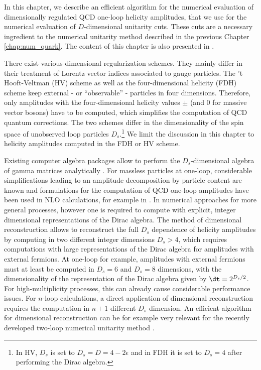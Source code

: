 In this chapter, we describe an efficient algorithm for the numerical
evaluation of dimensionally regulated
QCD one-loop helicity amplitudes, that we use for the numerical
evaluation of $D$-dimensional unitarity cuts. These cuts are a
necessary ingredient to the numerical
  unitarity method described in the previous Chapter
\ref{chap:num_quark}. The content of this chapter is also presented in \cite{angerds}.

There exist various dimensional
regularization schemes. They mainly differ in their
treatment of Lorentz vector indices associated to gauge particles. The
't Hooft-Veltman (HV) scheme \cite{tHooft:1972tcz} as well as the
four-dimensional helicity (FDH) scheme \cite{Bern:1991aq,Bern:2002zk}
keep external - or ``observable'' - particles in four
dimensions. Therefore, only amplitudes with the four-dimensional helicity values $\pm$ (and
$0$ for massive vector bosons) have
to be computed, which simplifies the computation of QCD quantum
corrections. The two schemes differ in the dimensionality
of the spin space of unobserved loop particles $D_s$.\footnote{In HV,
  $D_s$ is set to $D_s=D=4-2\epsilon$ and in FDH it is set to $D_s=4$ after
performing the Dirac algebra.} We limit the discussion in this chapter to
helicity amplitudes computed in the FDH or HV scheme.

Existing computer algebra packages allow to perform the $D_s$-dimensional algebra
of gamma matrices analytically \cite{Hahn:1998yk,Cullen2010}. For
massless particles at one-loop, considerable simplifications leading to an
amplitude decomposition by particle content are known
\cite{Bern:1994cg,Bern:2002zk,DeFreitas:2004kmi} and formulations for the
computation of QCD one-loop amplitudes \cite{Badger:2008cm} have been
used in NLO calculations, for example in \cite{BH:W5j,BH:Z4j}. In numerical
approaches for more general processes, however one is required to compute with explicit, integer dimensional representations of the Dirac algebra. The method of dimensional reconstruction
\cite{Giele:2008ve,Ellis:2008ir} allows to 
reconstruct the full $D_s$ dependence of helicity amplitudes by
computing in two different integer dimensions $D_s> 4$, which requires computations with large
representations of the Dirac algebra for amplitudes with external
fermions. At one-loop for example, amplitudes with external fermions
must at least be
computed in $D_s=6$ and $D_s=8$ dimensions, with the dimensionality
of the representation of the Dirac algebra given by $\dt=2^{D_s/2}$. For high-multiplicity processes, this can already cause
considerable performance issues. For $n$-loop calculations, a direct
application of dimensional reconstruction requires the computation in
$n+1$ different $D_s$ dimension. An efficient algorithm for
dimensional reconstruction can be for example very relevant for the
recently developed two-loop numerical unitarity method \cite{Abreu:2017xsl,Abreu:2017hqn}.

